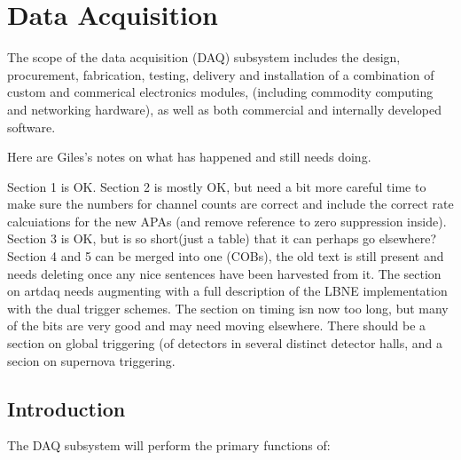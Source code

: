 

\newcommand{\LBNE}{[Expt-name] }

\chapter{Data Acquisition}
\label{ch:trig}

The scope of the data acquisition (DAQ) subsystem includes the 
design, procurement, fabrication, testing, delivery and installation 
of a combination of custom and commerical electronics modules, (including 
commodity computing and networking hardware), as well as both commercial 
and internally developed software.   

\begin{editornote}
Here are Giles's notes on what has happened and still needs doing.

Section 1 is OK.  Section 2 is mostly OK, but need a bit more careful
time to make sure the numbers for channel counts are correct and
include the correct rate calcuiations for the new APAs (and remove
reference to zero suppression inside).  Section 3 is OK, but is so
short(just a table) that it can perhaps go elsewhere?  Section 4 and 5
can be merged into one (COBs), the old text is still present and needs
deleting once any nice sentences have been harvested from it.  The
section on artdaq needs augmenting with a full description of the LBNE
implementation with the dual trigger schemes.  The section on timing
isn now too long, but many of the bits are very good and may need
moving elsewhere.  There should be a section on global triggering (of
detectors in several distinct detector halls, and a secion on
supernova triggering.
\end{editornote}

\section{Introduction}
The DAQ subsystem will perform the primary functions of:

